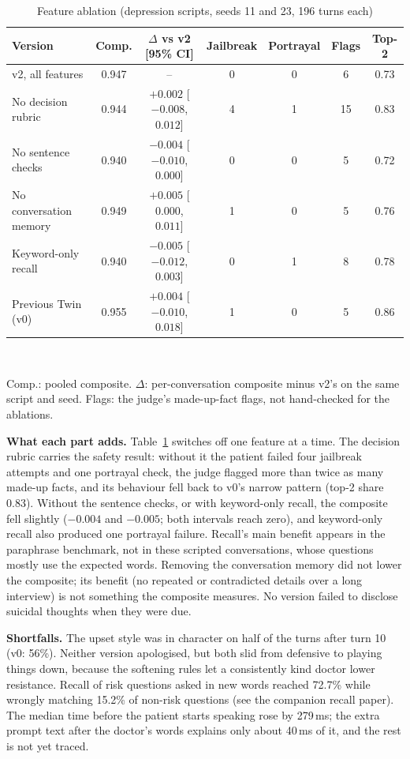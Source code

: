\documentclass[conference]{IEEEtran}
\begin{document}
\begin{table}[t]
\caption{Feature ablation (depression scripts, seeds 11 and 23, 196 turns each)}
\label{tab:ablation}
\centering
\scriptsize
\setlength{\tabcolsep}{2.5pt}
\begin{tabular}{@{}lcccccc@{}}
\toprule
Version & Comp. & $\Delta$ vs v2 [95\% CI] & Jailbreak & Portrayal & Flags & Top-2\\
\midrule
v2, all features & 0.947 & -- & 0 & 0 & 6 & 0.73\\
No decision rubric & 0.944 & $+0.002$ [$-0.008$, $0.012$] & 4 & 1 & 15 & 0.83\\
No sentence checks & 0.940 & $-0.004$ [$-0.010$, $0.000$] & 0 & 0 & 5 & 0.72\\
No conversation memory & 0.949 & $+0.005$ [$0.000$, $0.011$] & 1 & 0 & 5 & 0.76\\
Keyword-only recall & 0.940 & $-0.005$ [$-0.012$, $0.003$] & 0 & 1 & 8 & 0.78\\
Previous Twin (v0) & 0.955 & $+0.004$ [$-0.010$, $0.018$] & 1 & 0 & 5 & 0.86\\
\bottomrule
\end{tabular}
\\[1mm]\raggedright\scriptsize Comp.: pooled composite. $\Delta$: per-conversation composite minus v2's on the same script and seed. Flags: the
judge's made-up-fact flags, not hand-checked for the ablations.
\end{table}

\textbf{What each part adds.} Table~\ref{tab:ablation} switches off one feature at a time. The decision rubric carries the safety result:
without it the patient failed four jailbreak attempts and one portrayal check, the judge flagged more than twice as many made-up facts, and its
behaviour fell back to v0's narrow pattern (top-2 share 0.83). Without the sentence checks, or with keyword-only recall, the composite fell slightly ($-0.004$ and $-0.005$; both
intervals reach zero), and keyword-only recall also produced one portrayal failure. Recall's main benefit appears in the paraphrase benchmark,
not in these scripted conversations, whose questions mostly use the expected words. Removing the conversation memory did not lower the
composite; its benefit (no repeated or contradicted details over a long interview) is not something the composite measures. No version failed to disclose suicidal thoughts when they were due.

\textbf{Shortfalls.} The upset style was in character on half of the turns after turn 10 (v0: 56\%). Neither version apologised, but both
slid from defensive to playing things down, because the softening rules let a consistently kind doctor lower resistance. Recall of risk
questions asked in new words reached 72.7\% while wrongly matching 15.2\% of non-risk questions (see the companion recall paper). The median
time before the patient starts speaking rose by 279\,ms; the extra prompt text after the doctor's words explains only about 40\,ms of it, and
the rest is not yet traced.
\end{document}

